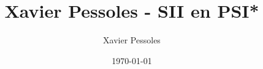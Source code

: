 \documentclass[
	fontsize=10pt, %
	twoside=true, %
]{kaobook}
\newcommand{\repRel}{../../..}
\newcommand{\repStyle}{\repRel/Style}
\begin{document}

\titlehead{Xavier Pessoles - SII en PSI*}
\title[Xavier Pessoles - SII en PSI*]{Xavier Pessoles - SII en PSI*}
\author[XP]{Xavier Pessoles}
\date{\today}


\begingroup %
\endgroup

%
\mainmatter %
%
%
%
%


\setcounter{margintocdepth}{\sectiontocdepth}
\marginlayout
\graphicspath{{\repStyle/png}}

\pagestyle{xp.scrheadings}


%



\newcommand{\repExo}{Application_01_ROV}
\newcommand{\nomExo}{Application_01_ROV}
\newcommand{\titrechapitre}{Banc d'essai BTP}

\livrettrue %
\livrettrue
\colletrue


%


%
%
\end{document}
